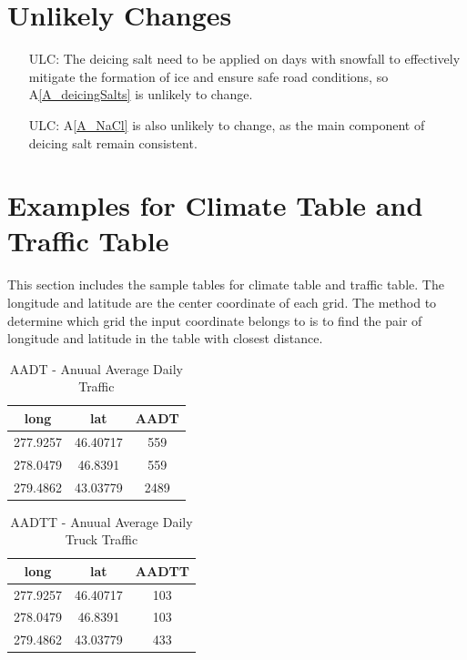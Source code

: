 \documentclass[12pt]{article}
\newcommand{\aref}[1]{A\ref{#1}}
\newcounter{lcnum} %
\newcounter{ulcnum} %
\begin{document}
\section{Unlikely Changes}    

\noindent \begin{itemize}
\item[ULC\refstepcounter{ulcnum}\theulcnum\label{ULC_saltSame}:] The deicing salt need to be applied on days with snowfall to effectively mitigate the formation of ice and ensure safe road conditions, so \aref{A_deicingSalts} is unlikely to change.

\item[ULC\refstepcounter{ulcnum}\theulcnum\label{ULC_NaCl}:] \aref{A_NaCl} is also unlikely to change, as the main component of deicing salt remain consistent.


\end{itemize}

\section{Examples for Climate Table and Traffic Table}
This section includes the sample tables for climate table and traffic table. The longitude and latitude are the center coordinate of each grid. The method to determine which grid the input coordinate belongs to is to find the pair of longitude and latitude in the table with closest distance.

\begin{table}[H]
\centering
\begin{tabular}{|c|c|c|}
\hline 
 long & lat & AADT \\

\hline
277.9257 & 46.40717 & 559 \\ \hline
278.0479 & 46.8391 & 559 \\ \hline
279.4862 & 43.03779 & 2489  \\ \hline
\end{tabular}
\caption{AADT - Anuual Average Daily Traffic}
\label{Table:AADT}
\end{table}



\begin{table}[H]
\centering
\begin{tabular}{|c|c|c|}
\hline 
 long & lat & AADTT \\

\hline
277.9257 & 46.40717 & 103 \\ \hline
278.0479 & 46.8391 & 103 \\ \hline
279.4862 & 43.03779 & 433  \\ \hline
\end{tabular}
\caption{AADTT - Anuual Average Daily Truck Traffic}
\label{Table:AADTT}
\end{table}
\end{document}
